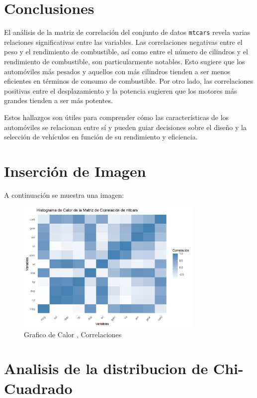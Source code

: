 \documentclass{article}
\begin{document}
\section{Conclusiones}
El análisis de la matriz de correlación del conjunto de datos \texttt{mtcars} revela varias relaciones significativas entre las variables. Las correlaciones negativas entre el peso y el rendimiento de combustible, así como entre el número de cilindros y el rendimiento de combustible, son particularmente notables. Esto sugiere que los automóviles más pesados y aquellos con más cilindros tienden a ser menos eficientes en términos de consumo de combustible. Por otro lado, las correlaciones positivas entre el desplazamiento y la potencia sugieren que los motores más grandes tienden a ser más potentes.

Estos hallazgos son útiles para comprender cómo las características de los automóviles se relacionan entre sí y pueden guiar decisiones sobre el diseño y la selección de vehículos en función de su rendimiento y eficiencia.
\section{Inserción de Imagen}
A continuación se muestra una imagen:

\begin{figure}[h] %
    \centering %
    \includegraphics[width=0.8\textwidth]{imagen.png}
    \caption{Grafico de Calor , Correlaciones } %
    \label{fig:mi_imagen} %
\end{figure}
\section{Analisis de la distribucion de Chi-Cuadrado}
\end{document}
